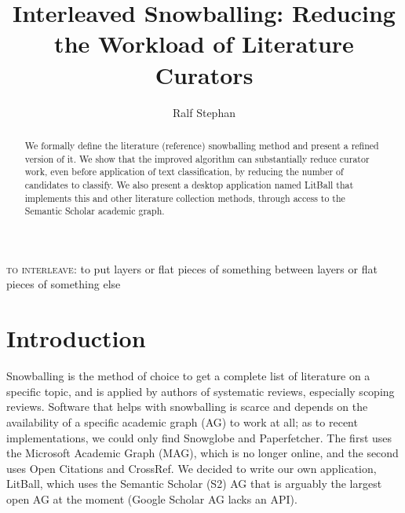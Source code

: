 \documentclass{article}
\begin{document}
\title{Interleaved Snowballing: Reducing the Workload of Literature Curators}
\author{Ralf Stephan}
\maketitle

\begin{abstract}
We formally define the literature (reference) snowballing method and present a refined version of it. We show that the improved algorithm can substantially reduce curator work, even before application of text classification, by reducing the number of candidates to classify. We also present a desktop application named LitBall\cite{litball} that implements this and other literature collection methods, through access to the Semantic Scholar academic graph\cite{Kinney2023TheSS}.
\end {abstract}

\begin{minipage}[t][3\baselineskip][t]{\linewidth}
\epigraph{\textsc{to interleave:} to put layers or flat pieces of something between layers or flat pieces of something else}{}
\end{minipage}
\section*{Introduction}
Snowballing is the method of choice to get a complete list of literature on a specific topic, and is applied by authors of systematic reviews, especially scoping reviews\cite{choong2014automatic,greenhalgh2005effectiveness,shemilt2014pinpointing,wohlin2014guidelines}.
Software that helps with snowballing is scarce and depends on the availability of a specific academic graph (AG) to work at all; as to recent implementations, we could only find Snowglobe\cite{mcweeny2021snowglobe} and Paperfetcher\cite{Pallath_2022}. The first uses the Microsoft Academic Graph (MAG)\cite{sinha2015overview}, which is no longer online, and the second uses Open Citations\cite{peroni2020opencitations} and CrossRef\cite{hendricks2020crossref}. We decided to write our own application, LitBall\cite{litball}, which uses the Semantic Scholar (S2) AG\cite{Kinney2023TheSS} that is arguably the largest open AG at the moment (Google Scholar AG lacks an API).
\end{document}
